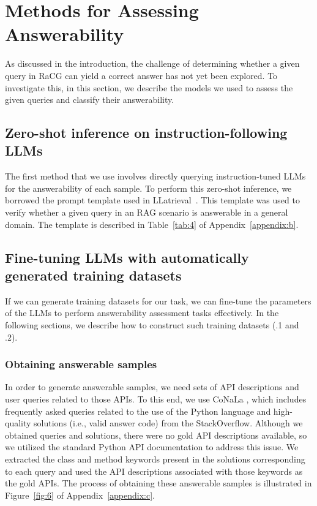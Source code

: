 \section{Methods for Assessing Answerability}
As discussed in the introduction, the challenge of determining whether a given query in RaCG can yield a correct answer has not yet been explored. To investigate this, in this section, we describe the models we used to assess the given queries and classify their answerability.

\subsection{Zero-shot inference on instruction-following LLMs}
The first method that we use involves directly querying instruction-tuned LLMs for the answerability of each sample. To perform this zero-shot inference, we borrowed the prompt template used in LLatrieval~\cite{li-etal-2024-llatrieval}. This template was used to verify whether a given query in an RAG scenario is answerable in a general domain. The template is described in Table~\ref{tab:4} of Appendix~\ref{appendix:b}.

\subsection{Fine-tuning LLMs with automatically generated training datasets}
If we can generate training datasets for our task, we can fine-tune the parameters of the LLMs to perform answerability assessment tasks effectively. In the following sections, we describe how to construct such training datasets (.1 and .2). 

\subsubsection{Obtaining answerable samples}
In order to generate answerable samples, we need sets of API descriptions and user queries related to those APIs. To this end, we use CoNaLa \cite{yin2018conala}, which includes frequently asked queries related to the use of the Python language and high-quality solutions (i.e., valid answer code) from the StackOverflow. Although we obtained queries and solutions, there were no gold API descriptions available, so we utilized the standard Python API documentation to address this issue. We extracted the class and method keywords present in the solutions corresponding to each query and used the API descriptions associated with those keywords as the gold APIs. The process of obtaining these answerable samples is illustrated in Figure~\ref{fig:6} of Appendix~\ref{appendix:c}.

